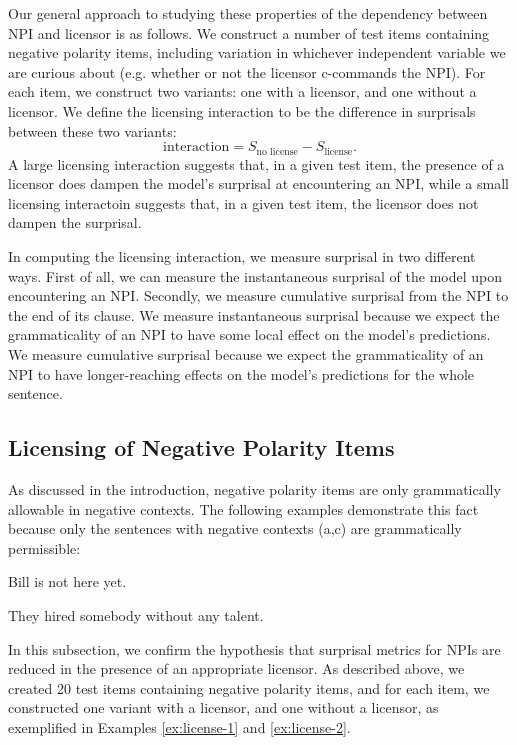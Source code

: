 \documentclass[11pt, round]{article}
\begin{document}
Our general approach to studying these properties of the dependency between NPI and licensor is as follows. We construct a number of test items containing negative polarity items, including variation in whichever independent variable we are curious about (e.g. whether or not the licensor c-commands the NPI). For each item, we construct two variants: one with a licensor, and one without a licensor. We define the licensing interaction to be the difference in surprisals between these two variants:
\[ \textrm{interaction} = S_{\textrm{no license}} - S_{\textrm{license}}. \]
A large licensing interaction suggests that, in a given test item, the presence of a licensor does dampen the model's surprisal at encountering an NPI, while a small licensing interactoin suggests that, in a given test item, the licensor does not dampen the surprisal.

In computing the licensing interaction, we measure surprisal in two different ways. First of all, we can measure the instantaneous surprisal of the model upon encountering an NPI. Secondly, we measure cumulative surprisal from the NPI to the end of its clause. We measure instantaneous surprisal because we expect the grammaticality of an NPI to have some local effect on the model's predictions. We measure cumulative surprisal because we expect the grammaticality of an NPI to have longer-reaching effects on the model's predictions for the whole sentence.

\subsection{Licensing of Negative Polarity Items}

As discussed in the introduction, negative polarity items are only grammatically allowable in negative contexts. The following examples demonstrate this fact because only the sentences with negative contexts (a,c) are grammatically permissible:
\begin{exe}
\ex\label{ex:license-1}
\begin{xlist}
\ex Bill is not here yet.
\end{xlist}
\ex\label{ex:license-2}
\begin{xlist}
\ex They hired somebody without any talent.
\end{xlist}
\end{exe}
In this subsection, we confirm the hypothesis that surprisal metrics for NPIs are reduced in the presence of an appropriate licensor. As described above, we created 20 test items containing negative polarity items, and for each item, we constructed one variant with a licensor, and one without a licensor, as exemplified in Examples \ref{ex:license-1} and \ref{ex:license-2}.
\end{document}
